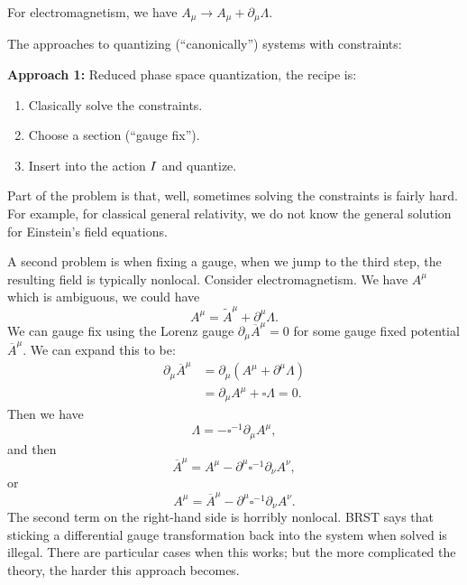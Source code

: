 For electromagnetism, we have $A_{\mu}\to
A_{\mu}+\partial_{\mu}\Lambda$.

The approaches to quantizing (``canonically'') systems with constraints:

\bigbreak
\textbf{Approach 1:} Reduced phase space quantization, the recipe is:
\begin{enumerate}
\item Clasically solve the constraints.
\item Choose a section (``gauge fix'').
\item Insert into the action $I$ and quantize.
\end{enumerate}
Part of the problem is that, well, sometimes solving the constraints
is fairly hard. For example, for classical general relativity, we do
not know the general solution for Einstein's field equations.

A second problem is when fixing a gauge, when we jump to the third step,
the resulting field is typically nonlocal. Consider electromagnetism. We
have $A^{\mu}$ which is ambiguous, we could have
\begin{equation}
A^{\mu} = \widetilde{A}^{\mu} + \partial^{\mu}\Lambda.
\end{equation}
We can gauge fix using the Lorenz gauge
$\partial_{\mu}\overline{A}^{\mu}=0$ for some gauge fixed potential
$\overline{A}^{\mu}$. We can expand this to be:
\begin{subequations}
\begin{align}
\partial_{\mu}\overline{A}^{\mu}
&= \partial_{\mu}(A^{\mu} + \partial^{\mu}\Lambda)\\
&=\partial_{\mu}A^{\mu} + \square\Lambda = 0.
\end{align}
\end{subequations}
Then we have
\begin{equation}
\Lambda = -\square^{-1}\partial_{\mu}A^{\mu},
\end{equation}
and then
\begin{equation}
\overline{A}^{\mu} = A^{\mu} - \partial^{\mu}\square^{-1}\partial_{\nu}A^{\nu},
\end{equation}
or
\begin{equation}
A^{\mu} = \overline{A}^{\mu}  - \partial^{\mu}\square^{-1}\partial_{\nu}A^{\nu}.
\end{equation}
The second term on the right-hand side is horribly nonlocal. BRST says
that sticking a differential gauge transformation back into the system
when solved is illegal. There are particular cases when this works; but
the more complicated the theory, the harder this approach becomes.

